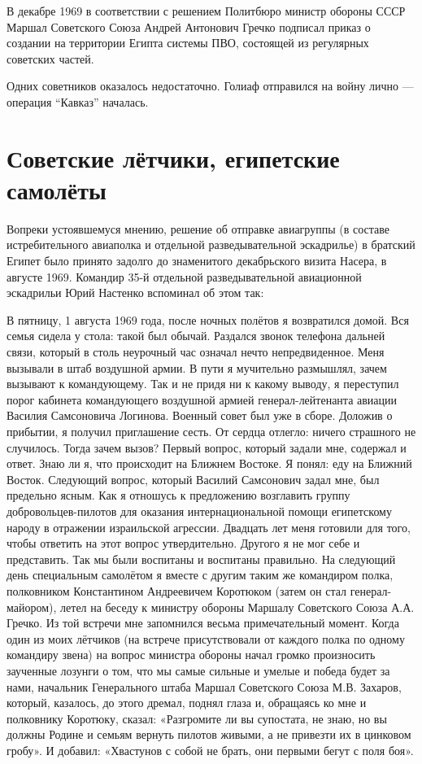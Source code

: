 В декабре 1969 в соответствии с решением Политбюро министр обороны СССР Маршал Советского Союза Андрей Антонович Гречко подписал приказ о создании на территории Египта системы ПВО, состоящей из регулярных советских частей.

Одних советников оказалось недостаточно. Голиаф отправился на войну лично — операция “Кавказ” началась. 

\section{Советские лётчики, египетские самолёты}

Вопреки устоявшемуся мнению, решение об отправке авиагруппы (в составе истребительного авиаполка и отдельной разведывательной эскадрилье) в братский Египет было принято задолго до знаменитого декабрьского визита Насера, в августе 1969. Командир 35-й отдельной разведывательной авиационной эскадрильи Юрий Настенко вспоминал об этом так:

\begin{textcitation}
	В пятницу, 1 августа 1969 года, после ночных полётов я возвратился домой. Вся семья сидела у стола: такой был обычай. Раздался звонок телефона дальней связи, который в столь неурочный час означал нечто непредвиденное. Меня вызывали в штаб воздушной армии. В пути я мучительно размышлял, зачем вызывают к командующему.
	Так и не придя ни к какому выводу, я переступил порог кабинета командующего воздушной армией генерал-лейтенанта авиации Василия Самсоновича Логинова. Военный совет был уже в сборе. Доложив о прибытии, я получил приглашение сесть.
	От сердца отлегло: ничего страшного не случилось. Тогда зачем вызов? Первый вопрос, который задали мне, содержал и ответ. Знаю ли я, что происходит на Ближнем Востоке. Я понял: еду на Ближний Восток.
	Следующий вопрос, который Василий Самсонович задал мне, был предельно ясным. Как я отношусь к предложению возглавить группу добровольцев-пилотов для оказания интернациональной помощи египетскому народу в отражении израильской агрессии. Двадцать лет меня готовили для того, чтобы ответить на этот вопрос утвердительно. Другого я не мог себе и представить. Так мы были воспитаны и воспитаны правильно.
	На следующий день специальным самолётом я вместе с другим таким же командиром полка, полковником Константином Андреевичем Коротюком (затем он стал генерал-майором), летел на беседу к министру обороны Маршалу Советского Союза А.А. Гречко.
	Из той встречи мне запомнился весьма примечательный момент. Когда один из моих лётчиков (на встрече присутствовали от каждого полка по одному командиру звена) на вопрос министра обороны начал громко произносить заученные лозунги о том, что мы самые сильные и умелые и победа будет за нами, начальник Генерального штаба Маршал Советского Союза М.В. Захаров, который, казалось, до этого дремал, поднял глаза и, обращаясь ко мне и полковнику Коротюку, сказал: «Разгромите ли вы супостата, не знаю, но вы должны Родине и семьям вернуть пилотов живыми, а не привезти их в цинковом гробу». И добавил: «Хвастунов с собой не брать, они первыми бегут с поля боя».
\end{textcitation}

